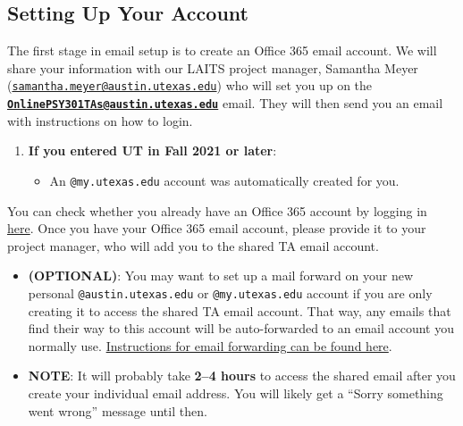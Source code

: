 \documentclass[
]{article}
\providecommand{\tightlist}{%
  \setlength{\itemsep}{0pt}\setlength{\parskip}{0pt}}
\begin{document}
\hypertarget{setting-up-your-account}{%
\subsection{Setting Up Your Account}\label{setting-up-your-account}}

The first stage in email setup is to create an Office 365 email account. We will share your information with our LAITS project manager, Samantha Meyer (\href{mailto:samantha.meyer@austin.utexas.edu}{\nolinkurl{samantha.meyer@austin.utexas.edu}}) who will set you up on the \textbf{\href{mailto:OnlinePSY301TAs@austin.utexas.edu}{\nolinkurl{OnlinePSY301TAs@austin.utexas.edu}}} email. They will then send you an email with instructions on how to login.

\begin{enumerate}
\def\labelenumi{\arabic{enumi}.}
\tightlist
\item
  \textbf{If you entered UT in Fall 2021 or later}:

  \begin{itemize}
  \tightlist
  \item
    An \texttt{@my.utexas.edu} account was automatically created for you.
  \end{itemize}
\end{enumerate}

You can check whether you already have an Office 365 account by logging in \href{https://www.austin.utexas.edu/Office365Management/}{here}. Once you have your Office 365 email account, please provide it to your project manager, who will add you to the shared TA email account.

\begin{itemize}
\tightlist
\item
  \textbf{(OPTIONAL)}: You may want to set up a mail forward on your new personal \texttt{@austin.utexas.edu} or \texttt{@my.utexas.edu} account if you are only creating it to access the shared TA email account. That way, any emails that find their way to this account will be auto-forwarded to an email account you normally use. \href{https://ut.service-now.com/sp?id=kb_article\&number=KB0011657}{Instructions for email forwarding can be found here}.
\item
  \textbf{NOTE}: It will probably take \textbf{2--4 hours} to access the shared email after you create your individual email address. You will likely get a ``Sorry something went wrong'' message until then.
\end{itemize}
\end{document}
